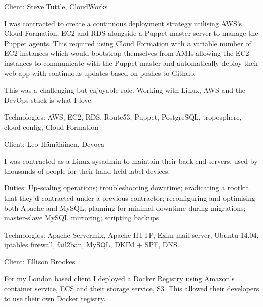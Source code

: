 \documentclass[12pt]{article}
\newenvironment{outerlist}[1][\enskip\textbullet]%
	{\begin{itemize}[#1]}{\end{itemize}%
		\vspace{-.6\baselineskip}}
\newenvironment{innerlist}[1][\enskip\textbullet]%
	{\begin{compactitem}[#1]}{\end{compactitem}}
\newcommand{\halfblankline}{\quad\vspace{-0.5\baselineskip}\pagebreak[3]}
\begin{document}
\begin{outerlist}
			\item[] Client: Steve Tuttle, CloudWorks
			\begin{innerlist}
				\item I was contracted to create a continuous deployment strategy utilising AWS's Cloud Formation, EC2 and RDS alongside a Puppet master server to manage the Puppet agents. This required using Cloud Formation with a variable number of EC2 instances which would bootstrap themselves from AMIs allowing the EC2 instances to communicate with the Puppet master and automatically deploy their web app with continuous updates based on pushes to Github.
				\item This was a challenging but enjoyable role. Working with Linux, AWS and the DevOps stack is what I love.
				\item Technologies: AWS, EC2, RDS, Route53, Puppet, PostgreSQL, troposphere, cloud-config, Cloud Formation
			\end{innerlist}
			\item[] Client: Leo Hämäläinen, Devoca
			\begin{innerlist}
				\item I was contracted as a Linux sysadmin to maintain their back-end servers, used by thousands of people for their hand-held label devices.
				\item Duties: Up-scaling operations; troubleshooting downtime; eradicating a rootkit that they'd contracted under a previous contractor; reconfiguring and optimising both Apache and MySQL; planning for minimal downtime during migrations; master-slave MySQL mirroring; scripting backups
				\item Technologies: Apache Servermix, Apache HTTP, Exim mail server, Ubuntu 14.04, iptables firewall, fail2ban, MySQL, DKIM + SPF, DNS
			\end{innerlist}
			\item[] Client: Ellison Brookes
			\begin{innerlist}
				\item For my London based client I deployed a Docker Registry using Amazon's container service, ECS and their storage service, S3. This allowed their developers to use their own Docker registry.
			\end{innerlist}
		\end{outerlist}
		
		\halfblankline
		
\end{document}
